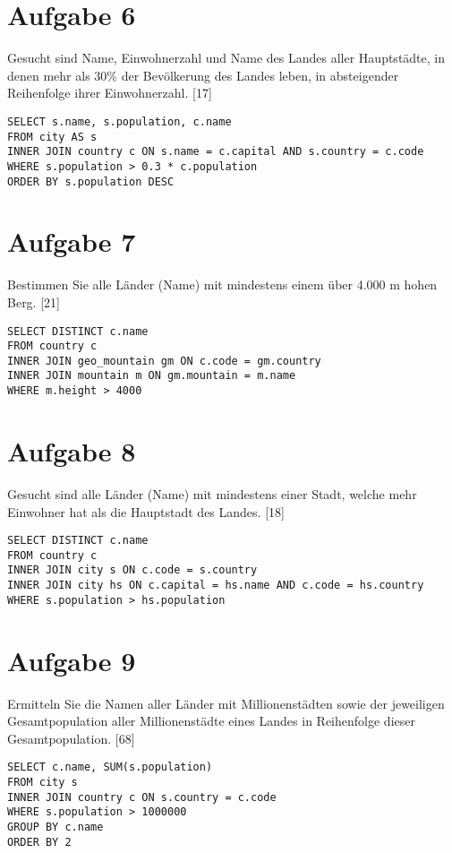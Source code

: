\documentclass{article}
\begin{document}
	\section*{Aufgabe 6}
	Gesucht sind Name, Einwohnerzahl und Name des Landes aller Hauptstädte, in denen mehr als 30\% der Bevölkerung des Landes leben, in absteigender Reihenfolge ihrer Einwohnerzahl. [17]
	\begin{lstlisting}[style=sql,tabsize=2]
SELECT s.name, s.population, c.name
FROM city AS s 
INNER JOIN country c ON s.name = c.capital AND s.country = c.code 
WHERE s.population > 0.3 * c.population
ORDER BY s.population DESC
	\end{lstlisting}
	
	\section*{Aufgabe 7}
	Bestimmen Sie alle Länder (Name) mit mindestens einem über 4.000 m hohen Berg. [21]
	\begin{lstlisting}[style=sql,tabsize=2]
SELECT DISTINCT c.name
FROM country c 
INNER JOIN geo_mountain gm ON c.code = gm.country 
INNER JOIN mountain m ON gm.mountain = m.name
WHERE m.height > 4000
	\end{lstlisting}
	
	\section*{Aufgabe 8}
	Gesucht sind alle Länder (Name) mit mindestens einer Stadt, welche mehr Einwohner hat als die Hauptstadt des Landes. [18]
	\begin{lstlisting}[style=sql,tabsize=2]
SELECT DISTINCT c.name
FROM country c 
INNER JOIN city s ON c.code = s.country 
INNER JOIN city hs ON c.capital = hs.name AND c.code = hs.country
WHERE s.population > hs.population
	\end{lstlisting}
	
	\section*{Aufgabe 9}
	Ermitteln Sie die Namen aller Länder mit Millionenstädten sowie der jeweiligen Gesamtpopulation aller Millionenstädte eines Landes in Reihenfolge dieser Gesamtpopulation. [68]
	\begin{lstlisting}[style=sql,tabsize=2]
SELECT c.name, SUM(s.population)
FROM city s 
INNER JOIN country c ON s.country = c.code 
WHERE s.population > 1000000
GROUP BY c.name
ORDER BY 2
	\end{lstlisting}
	
\end{document}
